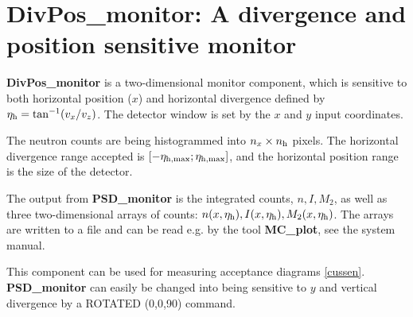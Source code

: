 
\section{DivPos\_monitor: A divergence and position sensitive monitor}

{\bf DivPos\_monitor} is a two-dimensional monitor component,
which is sensitive to both horizontal position ($x$) and horizontal divergence
defined by $\eta_{\rm h} = \tan^{-1}(v_x/v_z)$.
The detector window is set
by the $x$ and $y$ input coordinates.

The neutron counts are being histogrammed
into $n_x \times n_{\rm h}$ pixels. The horizontal divergence range accepted is
$[-\eta_{\rm h,max}; \eta_{\rm h,max}]$, and the horizontal position
range is the size of the detector.

The output from {\bf PSD\_monitor} is the integrated counts, $n, I, M_2$,
as well as
three two-dimensional arrays of counts: $n(x,\eta_{\rm h}),
I(x,\eta_{\rm h}), M_2(x,\eta_{\rm h})$.
The arrays are written to a file and can be read e.g. by the tool
{\bf MC\_plot}, see the system manual.

This component can be used for measuring acceptance diagrams \ref{cussen}.
{\bf PSD\_monitor} can easily be changed into being sensitive
to $y$ and vertical divergence by a ROTATED (0,0,90) command.